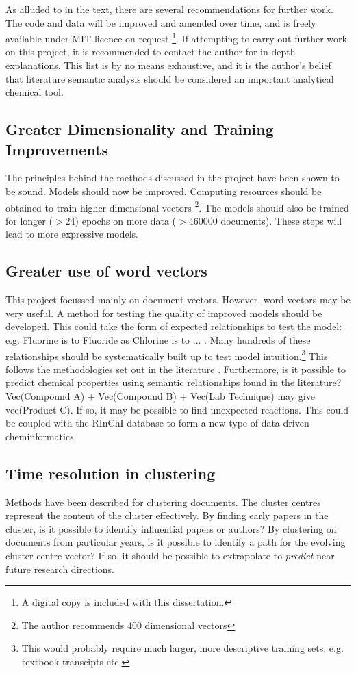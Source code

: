 \label{chapt:RECOMMENDATIONS}
As alluded to in the text, there are several recommendations for further work. The code and data will be improved and amended over time, and is freely available under MIT licence on request \footnote{A digital copy is included with this dissertation.}. If attempting to carry out further work on this project, it is recommended to contact the author for in-depth explanations. This list is by no means exhaustive, and it is the author's belief that literature semantic analysis should be considered an important analytical chemical tool.
\subsection{Greater Dimensionality and Training Improvements}
The principles behind the methods discussed in the project have been shown to be sound. Models should now be improved. Computing resources should be obtained to train higher dimensional vectors \footnote{ The author recommends 400 dimensional vectors}. The models should also be trained for longer ($> 24$) epochs on more data ($> 460000$ documents). These steps will lead to more expressive models.
\subsection{Greater use of word vectors}
\label{sec:recomm_word_vectors}
This project focussed mainly on document vectors. However, word vectors may be very useful. A method for testing the quality of improved models should be developed. This could take the form of expected relationships to test the model: e.g. Fluorine is to Fluoride as Chlorine is to ... . Many hundreds of these relationships should be systematically built up to test model intuition.\footnote{This would probably require much larger, more descriptive training sets, e.g. textbook transcipts etc.} This follows the methodologies set out in the literature \cite{word2vec1} \cite{word2vec2}. Furthermore, is it possible to predict chemical properties using semantic relationships found in the literature? Vec(Compound A) + Vec(Compound B) + Vec(Lab Technique) may give vec(Product C). If so, it may be possible to find unexpected reactions. This could be coupled with the RInChI database to form a new type of data-driven cheminformatics.
\subsection{Time resolution in clustering}
Methods have been described for clustering documents. The cluster centres represent the content of the cluster effectively. By finding early papers in the cluster, is it possible to identify influential papers or authors?
By clustering on documents from particular years, is it possible to identify a path for the evolving cluster centre vector? If so, it should be possible to extrapolate to \emph{predict} near future research directions.
